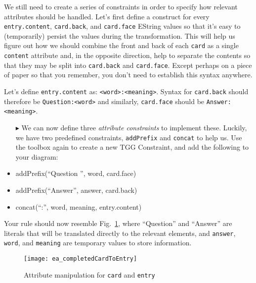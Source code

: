 We still need to create a series of constraints in order to specify how relevant attributes should be handled. Let's first define a construct for every
\texttt{entry.content}, \texttt{card.back}, and \texttt{card.face} EString values so that it's easy to (temporarily) persist the values during the
transformation. This will help us figure out how we should combine the front and back of each \texttt{card} as a single \texttt{content} attribute and,
in the opposite direction, help to separate the contents so that they may be split into \texttt{card.back} and \texttt{card.face}. Except
perhaps on a piece of paper so that you remember, you don't need to establish this syntax anywhere. 

Let's define \texttt{entry.content} as: \texttt{<word>:<meaning>}.  Syntax for \texttt{card.back} should therefore be \texttt{Question:<word>} and
similarly, \texttt{card.face} should be \texttt{Answer:<meaning>}. 


\begin{itemize}

\item[$\blacktriangleright$] We can now define three \emph{attribute constraints} to implement these. Luckily, we have two predefined constraints, \texttt{addPrefix} and
\texttt{concat} to help us. Use the toolbox again to create a new TGG Constraint, and add the following to your diagram:

  \item addPrefix(``Question '', word, card.face)
  \item addPrefix(``Answer'', answer, card.back)
  \item concat(``:'', word, meaning, entry.content)
  
\end{itemize}

Your rule should now resemble Fig.~\ref{fig:cardtoentry_2}, where ``Question'' and ``Answer'' are literals that will be translated directly to the relevant
elements, and \texttt{answer}, \texttt{word}, and \texttt{meaning} are temporary values to store information.

\vspace{0.5cm}

\begin{figure}[htbp]
\begin{center}
  \texttt{[image: ea\_completedCardToEntry]}
  \caption{Attribute manipulation for \texttt{card} and \texttt{entry}}
  \label{fig:cardtoentry_2}
\end{center}
\end{figure}
\FloatBarrier


